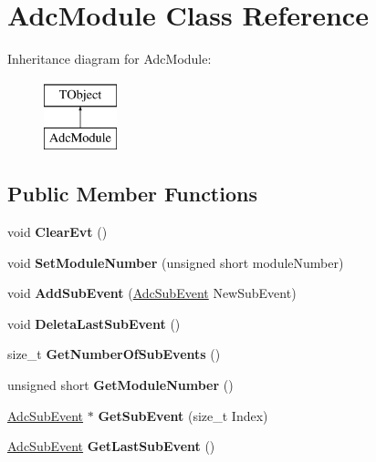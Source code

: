 \hypertarget{class_adc_module}{}\section{Adc\+Module Class Reference}
\label{class_adc_module}
Inheritance diagram for Adc\+Module\+:\begin{figure}[H]
\begin{center}
\leavevmode
\includegraphics[height=2.000000cm]{class_adc_module}
\end{center}
\end{figure}
\subsection*{Public Member Functions}
\begin{DoxyCompactItemize}
\item 
\mbox{\label{class_adc_module_a04ea54bf49f99a47d9b16011cf0d5efd}} 
void {\bfseries Clear\+Evt} ()
\item 
\mbox{\label{class_adc_module_a6debf2b84685eef14f16be21baa6adab}} 
void {\bfseries Set\+Module\+Number} (unsigned short module\+Number)
\item 
\mbox{\label{class_adc_module_a3a156c91cd5ba2e1195d9bc31a88bd92}} 
void {\bfseries Add\+Sub\+Event} (\hyperlink{class_adc_sub_event}{Adc\+Sub\+Event} New\+Sub\+Event)
\item 
\mbox{\label{class_adc_module_ae8b246298ada5eb002cfefc383810ddc}} 
void {\bfseries Deleta\+Last\+Sub\+Event} ()
\item 
\mbox{\label{class_adc_module_ae58f16947fe1a686aba589be53cfadf5}} 
size\+\_\+t {\bfseries Get\+Number\+Of\+Sub\+Events} ()
\item 
\mbox{\label{class_adc_module_aeffd018af28812f62907bbd7e0e4bccc}} 
unsigned short {\bfseries Get\+Module\+Number} ()
\item 
\mbox{\label{class_adc_module_a2a5274842c08316c6cb694ecbbd502c6}} 
\hyperlink{class_adc_sub_event}{Adc\+Sub\+Event} $\ast$ {\bfseries Get\+Sub\+Event} (size\+\_\+t Index)
\item 
\mbox{\label{class_adc_module_a34e67e298e392a934a97c3ebad4b30e4}} 
\hyperlink{class_adc_sub_event}{Adc\+Sub\+Event} {\bfseries Get\+Last\+Sub\+Event} ()
\end{DoxyCompactItemize}
